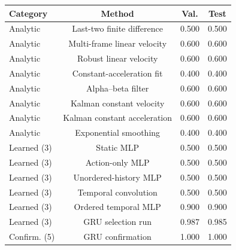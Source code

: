 \begin{tabular}{lccc}
\toprule
Category & Method & Val. & Test \\
\midrule
Analytic & Last-two finite difference & 0.500 & 0.500 \\
Analytic & Multi-frame linear velocity & 0.600 & 0.600 \\
Analytic & Robust linear velocity & 0.600 & 0.600 \\
Analytic & Constant-acceleration fit & 0.400 & 0.400 \\
Analytic & Alpha--beta filter & 0.600 & 0.600 \\
Analytic & Kalman constant velocity & 0.600 & 0.600 \\
Analytic & Kalman constant acceleration & 0.600 & 0.600 \\
Analytic & Exponential smoothing & 0.400 & 0.400 \\
Learned (3) & Static MLP & 0.500 & 0.500 \\
Learned (3) & Action-only MLP & 0.500 & 0.500 \\
Learned (3) & Unordered-history MLP & 0.500 & 0.500 \\
Learned (3) & Temporal convolution & 0.500 & 0.500 \\
Learned (3) & Ordered temporal MLP & 0.900 & 0.900 \\
Learned (3) & GRU selection run & 0.987 & 0.985 \\
Confirm. (5) & GRU confirmation & 1.000 & 1.000 \\
\bottomrule
\end{tabular}
